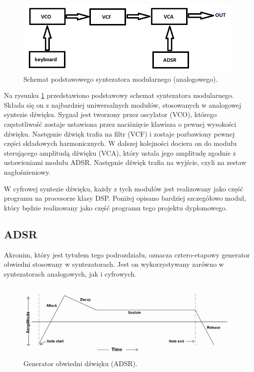 \begin{figure}[H]
	\centering
	\includegraphics[width=12cm]{./grafiki/analog_synth_scheme}
	\captionsetup{justification=centering}
	\caption{Schemat podstawowego syntezatora modularnego (analogowego).}
	\label{rys:analog_scheme}
\end{figure}

Na rysunku \ref{rys:analog_scheme} przedstawiono podstawowy schemat syntezatora modularnego. Składa się on z najbardziej uniwersalnych modułów, stosowanych w analogowej syntezie dźwięku. Sygnał jest tworzony przez oscylator (VCO), którego częstotliwość zostaje ustawiona przez naciśnięcie klawisza o pewnej wysokości dźwięku. Następnie dźwięk trafia na filtr (VCF) i zostaje pozbawiony pewnej części składowych harmonicznych. W dalszej kolejności dociera on do modułu sterującego amplitudą dźwięku (VCA), który ustala jego amplitudę zgodnie z ustawieniami modułu ADSR. Następnie dźwięk trafia na wyjście, czyli na zestaw nagłośnieniowy.

W cyfrowej syntezie dźwięku, każdy z tych modułów jest realizowany jako część programu na procesorze klasy DSP. Poniżej opisano bardziej szczegółowo moduł, który będzie realizowany jako część programu tego projektu dyplomowego.

\subsection{ADSR}
Akronim, który jest tytułem tego podrozdziału, oznacza cztero-etapowy generator obwiedni stosowany w syntezatorach. Jest on wykorzystywany zarówno w syntezatorach analogowych, jak i cyfrowych.

\begin{figure}[H]
	\centering
	\includegraphics[width=15cm]{./grafiki/ADSR}
	\captionsetup{justification=centering}
	\caption{Generator obwiedni dźwięku (ADSR).}
	\label{rys:ADSR}
\end{figure}

